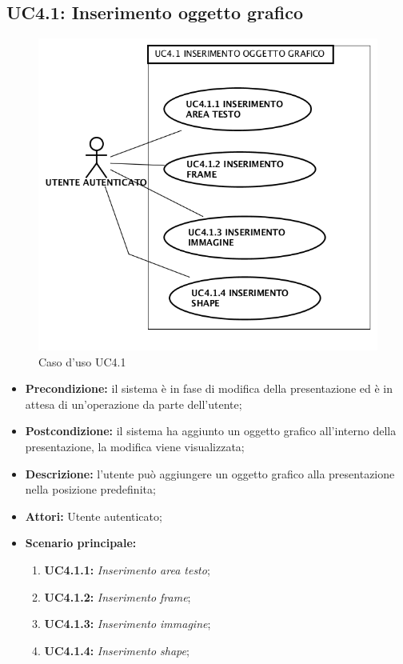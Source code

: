 \subsection{ UC4.1: Inserimento oggetto grafico}

\begin{figure}[H]
	\begin{center}
	\includegraphics[scale=0.4]{diagram/UC4-1.png}
	\caption{Caso d'uso UC4.1}
	\end{center}
\end{figure}
\begin{itemize}
	\item \textbf{Precondizione:} il sistema è in fase di modifica della presentazione ed è in attesa di un'operazione da parte dell'utente;
	\item \textbf{Postcondizione:} il sistema ha aggiunto un oggetto grafico all'interno della presentazione, la modifica viene visualizzata;
	\item \textbf{Descrizione:} l'utente può aggiungere un oggetto grafico alla presentazione nella posizione predefinita;
	\item \textbf{Attori:} Utente autenticato;
	\item \textbf{Scenario principale:}
	\begin{enumerate}
		\item \textbf{ UC4.1.1:} \textit{ Inserimento area testo};
		\item \textbf{ UC4.1.2:} \textit{ Inserimento frame};
		\item \textbf{ UC4.1.3:} \textit{ Inserimento immagine};
		\item \textbf{ UC4.1.4:} \textit{ Inserimento shape};
	\end{enumerate}
\end{itemize}

